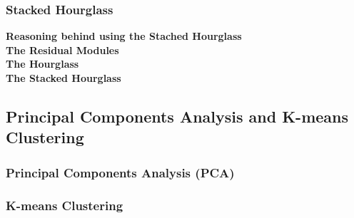 \documentclass[main.tex]{subfiles}
\begin{document}
\subsubsection{Stacked Hourglass}
\textbf{Reasoning behind using the Stached Hourglass} \\
\textbf{The Residual Modules}\\
\textbf{The Hourglass}\\
\textbf{The Stacked Hourglass}

\subsection{Principal Components Analysis and K-means Clustering}
\subsubsection{Principal Components Analysis (PCA)}
\subsubsection{K-means Clustering}
\end{document}

